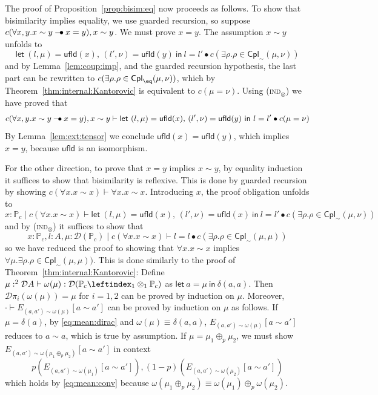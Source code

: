 \documentclass[a4paper,UKenglish,cleveref, autoref, thm-restate]{lipics-v2021}
\newcommand{\rasmus}[1]{{\color{blue}\textbf{R:}~#1}}
\newcommand{\mprod}{\otimes}
\newcommand{\D}{\mathcal{D}}
\newcommand{\pair}[2]{\otimes_{#1,#2}}
\renewcommand{\pair}[2]{\leftindex_{#1}\otimes_{#2}} %
\newcommand{\Proc}[1][\discfact]{\mathbb{P}_{#1}}
\newcommand{\Labels}{A}
\newcommand{\ts}{\vdash}
\newcommand{\hastype}[3]{#1\ts #2 : #3}
\newcommand{\letIn}[2]{\mathsf{let~} #1 \mathsf{~in~} #2}
\newcommand{\mean}[3]{E_{#1 \sim #2}[#3]}
\newcommand{\ltensor}{*}
\renewcommand{\ltensor}{\bullet}
\newcommand{\lexp}{\mathbin{{-}\kern-.2em\raisebox{0ex}{$*$}}}
\renewcommand{\lexp}{\mathbin{{-}\kern-.2em\raisebox{0ex}{$\bullet$}}}
\newcommand{\unfold}{\mathsf{ufld}}
\newcommand{\TD}{\mathcal{D}}
\newcommand{\coup}[4]{#2 \in \mathsf{Cpl}_{#1}(#3,#4)}
\newcommand{\bisim}{\sim} %
\newcommand{\discfact}{c} %
\newcommand{\logicJ}[3][\Delta]{#1 \mid #2 \vdash #3}
\newcommand{\peq}{=}
\newcommand{\jeq}{\equiv}
\newcommand{\defeq}{\triangleq}
\begin{document}
 The proof of Proposition~\ref{prop:bisim:eq} now proceeds as follows. To show that bisimilarity implies equality, we use 
 guarded recursion, so suppose
 $\discfact(\forall x,y . x\bisim y \lexp x \peq y), x \bisim y$. We must prove $x\peq y$. The assumption $x \bisim y$ unfolds to
 \[
 \letIn{(l, \mu) = \unfold(x), \,
    (l', \nu) = \unfold(y)}{
   l \peq l' \ltensor \discfact( \exists \rho . \coup{\bisim}\rho\mu\nu})
 \]
 and by Lemma~\ref{lem:coup:imp}, 
 and the guarded recursion hypothesis, the last part can be rewritten to 
 $\discfact(\exists \rho . \coup{\eq}\rho\mu\nu)$, which by Theorem~\ref{thm:internal:Kantorovic} is equivalent to 
 $\discfact(\mu \peq \nu)$. Using (\textsc{ind}${}_\mprod$) we have proved that 
 \[
   \discfact(\forall x,y . x\bisim y \lexp x \peq y), x \bisim y \ts 
   \letIn{(l, \mu) = \unfold(x), \,
    (l', \nu) = \unfold(y)}{
   l \peq l' \ltensor \discfact( \mu \peq\nu})
 \]
 By Lemma~\ref{lem:ext:tensor} we conclude $\unfold(x) \peq \unfold(y)$, which implies $x\peq y$,
 because $\unfold$ is an isomorphism.
 
 For the other direction, to prove that $x \peq y$ implies $x \bisim y$, by equality induction it suffices to show that 
 bisimilarity is reflexive. This is done by guarded recursion by showing $\discfact(\forall x. x\bisim x) \ts \forall x. x \bisim x$.
 Introducing $x$, the proof obligation unfolds to 
 \[
   \logicJ[x : \Proc]{\discfact(\forall x. x\bisim x)}{ 
   \letIn{(l, \mu) = \unfold(x), \,
    (l', \nu) = \unfold(x)}{
   l \peq l' \ltensor \discfact(  \exists \rho . \coup{\bisim}\rho\mu\nu})}
 \]
 and by (\textsc{ind}${}_\mprod$) it suffices to show that 
 \[
   \logicJ[x : \Proc, l : \Labels, \mu : \D(\Proc)]{\discfact(\forall x. x\bisim x)}{ 
   l \peq l \ltensor \discfact(  \exists \rho . \coup{\bisim}\rho\mu\mu)}
 \]
 so we have reduced the proof to showing that $\forall x. x\bisim x$ implies $\forall\mu . \exists \rho . \coup{\bisim}\rho\mu\mu)$.
 This is done similarly to the proof of Theorem~\ref{thm:internal:Kantorovic}:  
  Define $\hastype{\mu:^2 \TD A}{\omega(\mu)}{\TD(\Proc \pair11 \Proc)}$ as
 $\letIn{a = \mu}{\delta(a,a)}$. Then $\TD\pi_i(\omega(\mu)) \peq \mu$ for $i=1,2$ can be proved by induction on $\mu$.
Moreover, $\cdot \ts \mean{(a,a')}{\omega(\mu)}{a \bisim a'}$ can be proved by induction on $\mu$ as follows. If $\mu = \delta(a)$, 
by \eqref{eq:mean:dirac} and $\omega(\mu) \jeq \delta(a,a)$, $\mean{(a,a')}{\omega(\mu)}{a \bisim a'}$ reduces to $a\bisim a$, which is true
by assumption. If $\mu = \mu_1 \oplus_p \mu_2$, we must show
$\mean{(a,a')}{\omega(\mu_1\oplus_p \mu_2)}{a \bisim a'}$ in context
\[
 p(\mean{(a,a')}{\omega(\mu_1)}{a \bisim a'}), (1-p)(\mean{(a,a')}{\omega(\mu_2)}{a \bisim a'}) 
\]
which holds by \eqref{eq:mean:conv} because $\omega(\mu_1\oplus_p \mu_2) \jeq \omega(\mu_1)\oplus_p \omega(\mu_2)$.
\end{document}
